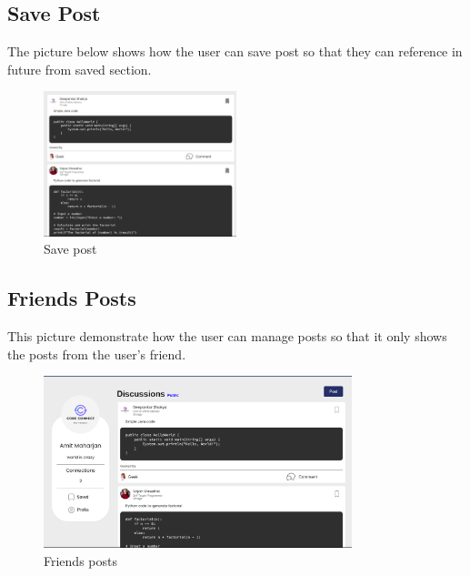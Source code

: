 \subsection{Save Post}
The picture below shows how the user can save post so that they can reference in future from saved section.
\begin{figure}[H]
    \centering
    \includegraphics[width=0.5\textwidth]{Outcome-ss/saved-posts-list.png}
    \caption{Save post}
    \label{fig:Save Post}
\end{figure}

\subsection{Friends Posts}
This picture demonstrate how the user can manage posts so that it only shows the posts from the user's friend.
\begin{figure}[H]
    \centering
    \includegraphics[width=0.8\textwidth]{Outcome-ss/friends-posts.png}
    \caption{Friends posts}
    \label{fig:Friends posts}
\end{figure}
\newpage

